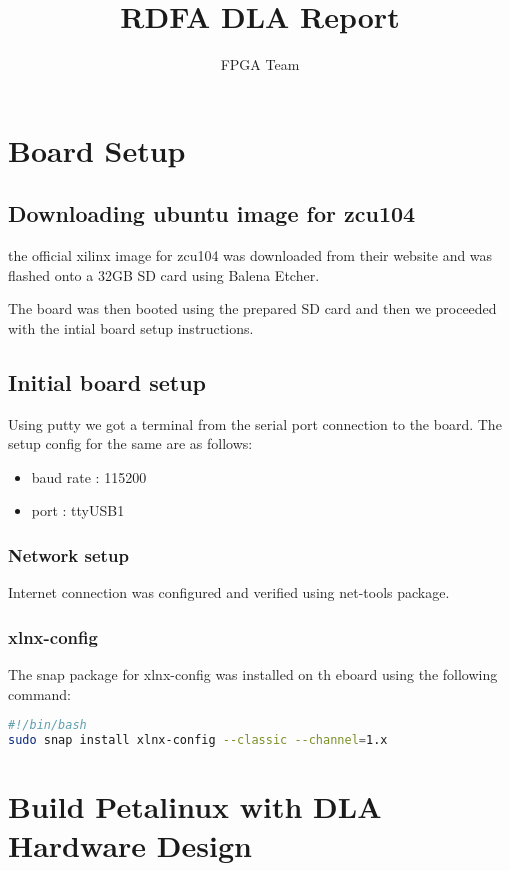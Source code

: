 \documentclass{article}
\title{RDFA DLA Report}
\author{FPGA Team}
\begin{document}
\maketitle
{}
\newpage
\tableofcontents
\newpage
{}

\section{Board Setup}
\subsection{Downloading ubuntu image for zcu104}
the official xilinx image for zcu104 was downloaded from their website and was flashed onto a 32GB SD
card using Balena Etcher.

\medbreak{}

The board was then booted using the prepared SD card and then we proceeded with the intial board setup
instructions.

\subsection{Initial board setup}
Using putty we got a terminal from the serial port connection to the board. The setup config for the same are as follows:
\begin{itemize}
    \item baud rate : 115200
    \item port : ttyUSB1
\end{itemize}

\subsubsection{Network setup}
Internet connection was configured and verified using net-tools package.

\subsubsection{xlnx-config}
The snap package for xlnx-config was installed on th eboard using the following command:
\begin{lstlisting}[language=bash]
#!/bin/bash
sudo snap install xlnx-config --classic --channel=1.x
\end{lstlisting}

\section{Build Petalinux with DLA Hardware Design}
\end{document}
